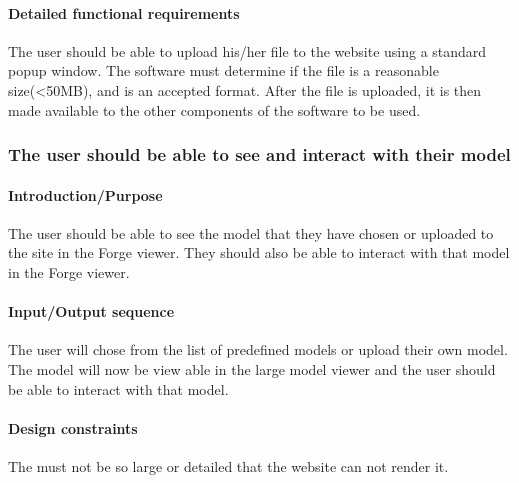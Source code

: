 \documentclass[letterpaper, 10pt, draftclsnofoot, compsoc, onecolumn]{IEEEtran}
\begin{document}
\paragraph[Detailed functional requirements of this
feature]{\rmfamily\bfseries\color{black}
Detailed functional requirements }
{\color{black} 
	The user should be able to upload his/her file to the website using a standard popup window. The software must determine if 
	the file is a reasonable size(<50MB), and is an accepted format. After the file is uploaded, it is then made available to the 
	other components of the software to be used.
 }


\subsubsection[{Viewable Model}]{\rmfamily\bfseries\color{black}
	The user should be able to see and interact with their model
}

\paragraph[Introduction/Purpose of this
feature]{\rmfamily\bfseries\color{black}
Introduction/Purpose }
{\color{black}
	The user should be able to see the model that they have chosen or uploaded to the site in the Forge viewer. They 
	should also be able to interact with that model in the Forge viewer. 
 }

\paragraph[Input/Output sequence for this
feature]{\rmfamily\bfseries\color{black}
Input/Output sequence }
{\color{black}
	The user will chose from the list of predefined models or upload their own model. The model will now be view able in the large 
	model viewer and the user should be able to interact with that model.
 }

\paragraph[Design constraints of this
feature]{\rmfamily\bfseries\color{black} Design constraints }
{\color{black}
	The must not be so large or detailed that the website can not render it.
}
\end{document}
